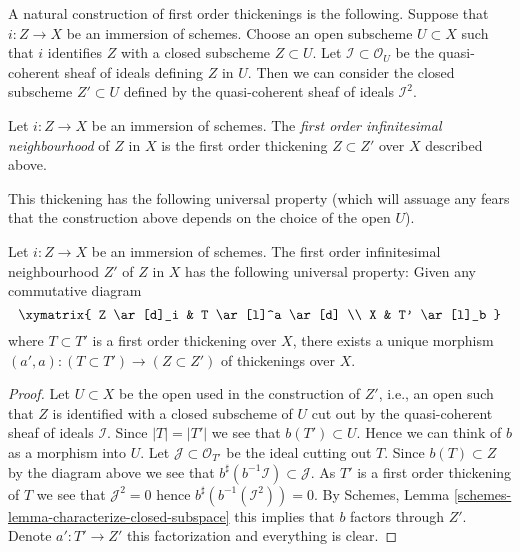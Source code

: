 \noindent
A natural construction of first order thickenings is the following.
Suppose that $i : Z \to X$ be an immersion of schemes. Choose an
open subscheme $U \subset X$ such that $i$ identifies $Z$ with a closed
subscheme $Z \subset U$. Let $\mathcal{I} \subset \mathcal{O}_U$ be the
quasi-coherent sheaf of ideals defining $Z$ in $U$. Then we can consider
the closed subscheme $Z' \subset U$ defined by the quasi-coherent sheaf
of ideals $\mathcal{I}^2$.

\begin{definition}
\label{definition-first-order-infinitesimal-neighbourhood}
Let $i : Z \to X$ be an immersion of schemes. The
{\it first order infinitesimal neighbourhood} of $Z$ in $X$ is
the first order thickening $Z \subset Z'$ over $X$ described above.
\end{definition}

\noindent
This thickening has the following universal property (which will assuage
any fears that the construction above depends on the choice of the open
$U$).

\begin{lemma}
\label{lemma-first-order-infinitesimal-neighbourhood}
Let $i : Z \to X$ be an immersion of schemes. The first order infinitesimal
neighbourhood $Z'$ of $Z$ in $X$ has the following universal property:
Given any commutative diagram
$$
\xymatrix{
Z \ar[d]_i & T \ar[l]^a \ar[d] \\
X & T' \ar[l]_b
}
$$
where $T \subset T'$ is a first order thickening over $X$, there exists
a unique morphism $(a', a) : (T \subset T') \to (Z \subset Z')$ of
thickenings over $X$.
\end{lemma}

\begin{proof}
Let $U \subset X$ be the open used in the construction of $Z'$, i.e., an
open such that $Z$ is identified with a closed subscheme of $U$ cut out by
the quasi-coherent sheaf of ideals $\mathcal{I}$.
Since $|T| = |T'|$ we see that $b(T') \subset U$. Hence we can
think of $b$ as a morphism into $U$. Let $\mathcal{J} \subset \mathcal{O}_{T'}$
be the ideal cutting out $T$. Since $b(T) \subset Z$ by the diagram above
we see that $b^\sharp(b^{-1}\mathcal{I}) \subset \mathcal{J}$. As
$T'$ is a first order thickening of $T$ we see that $\mathcal{J}^2 = 0$
hence $b^\sharp(b^{-1}(\mathcal{I}^2)) = 0$. By
Schemes, Lemma \ref{schemes-lemma-characterize-closed-subspace}
this implies that $b$ factors through $Z'$. Denote $a' : T' \to Z'$
this factorization and everything is clear.
\end{proof}

